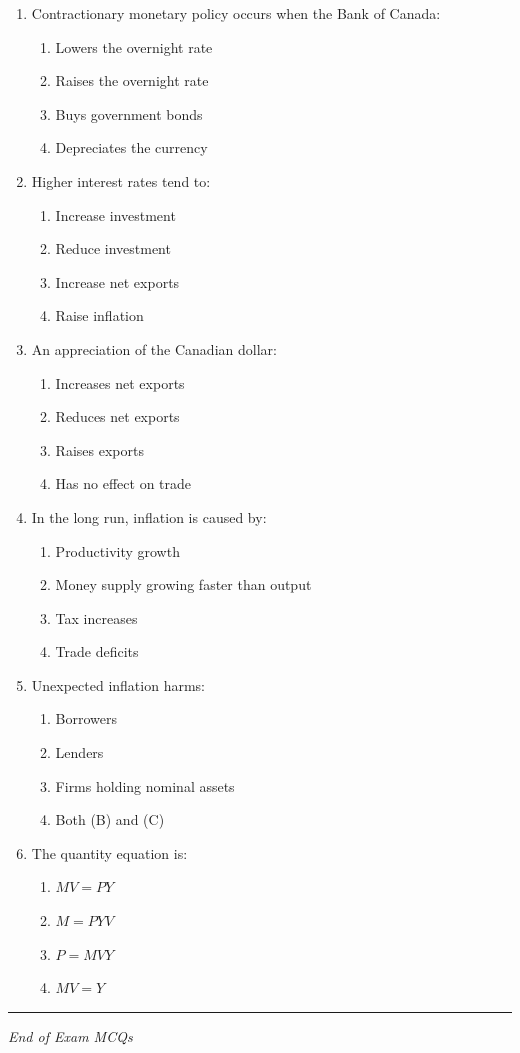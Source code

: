 \documentclass[12pt]{article}
\begin{document}
\begin{enumerate}[label=\textbf{\arabic*.}]
\item Contractionary monetary policy occurs when the Bank of Canada:
\begin{enumerate}[label=(\Alph*)]
    \item Lowers the overnight rate
    \item Raises the overnight rate
    \item Buys government bonds
    \item Depreciates the currency
\end{enumerate}

\item Higher interest rates tend to:
\begin{enumerate}[label=(\Alph*)]
    \item Increase investment
    \item Reduce investment
    \item Increase net exports
    \item Raise inflation
\end{enumerate}

\item An appreciation of the Canadian dollar:
\begin{enumerate}[label=(\Alph*)]
    \item Increases net exports
    \item Reduces net exports
    \item Raises exports
    \item Has no effect on trade
\end{enumerate}

\item In the long run, inflation is caused by:
\begin{enumerate}[label=(\Alph*)]
    \item Productivity growth
    \item Money supply growing faster than output
    \item Tax increases
    \item Trade deficits
\end{enumerate}
\newpage
\item Unexpected inflation harms:
\begin{enumerate}[label=(\Alph*)]
    \item Borrowers
    \item Lenders
    \item Firms holding nominal assets
    \item Both (B) and (C)
\end{enumerate}

\item The quantity equation is:
\begin{enumerate}[label=(\Alph*)]
    \item $MV = PY$
    \item $M = PYV$
    \item $P = MVY$
    \item $MV = Y$
\end{enumerate}

\end{enumerate}

\hrule
\vspace{1em}

\begin{center}
\textit{End of Exam MCQs}
\end{center}
\end{document}
